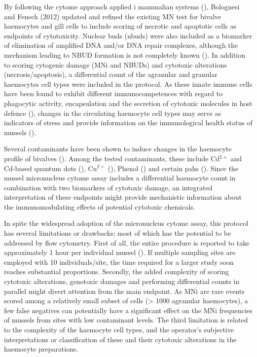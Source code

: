 By following the cytome approach applied i mammalian systems (\cite{Fenech2007}), Bolognesi and Fenech (2012) updated and refined the existing MN test for bivalve haemocytes and gill cells to include scoring of necrotic and apoptotic cells as endpoints of cytotoxicity. Nuclear buds (\acrshort{nbuds}) were also included as a biomarker of elimination of amplified DNA and/or DNA repair complexes, although the mechanism leading to NBUD formation is not completely known (\cite{Bolognesi2012}). In addition to scoring cytogenic damage (MNi and NBUDs) and cytotoxic alterations (necrosis/apoptosis), a differential count of the agranular and granular haemocytes cell types were included in the protocol. As these innate immune cells have been found to exhibit different immunocompetences with regard to phagocytic activity, encapsulation and the secretion of cytotoxic molecules in host defence (\cite{delaBallina2022}), changes in the circulating haemocyte cell types may serve as indicators of stress and provide information on the immunological health status of mussels (\cite{Couch1993}).

Several contaminants have been shown to induce changes in the haemocyte profile of bivalves (\cite{Couch1993}). Among the tested contaminants, these include Cd$^{2+}$ and Cd-based quantum dots (\cite{Rocha2014, Auffret1994}), Cu$^{2+}$ (\cite{Pipe1995, Pipe1999}), Phenol (\cite{Fries1980}) and certain \acrshort{pahs} (\cite{Dyrynda1998, Dyrynda2000}). Since the mussel micronucleus cytome assay includes a differential haemocyte count in combination with two biomarkers of cytotoxic damage, an integrated interpretation of these endpoints might provide mechanistic information about the immunomodulating effects of potential cytotoxic chemicals. 

In spite the widespread adoption of the micronucleus cytome assay, this protocol has several limitations or drawbacks; most of which has the potential to be addressed by flow cytometry. First of all, the entire procedure is reported to take approximately 1 hour per individual mussel (\cite{Bolognesi2012}). If multiple sampling sites are employed with 10 individuals/site, the time required for a larger study soon reaches substantial proportions. Secondly, the added complexity of scoring cytotoxic alterations, genotoxic damages and performing differential counts in parallel might divert attention from the main endpoint. As MNi are rare events scored among a relatively small subset of cells (> 1000 agranular haemocytes), a few false negatives can potentially have a significant effect on the MNi frequencies of mussels from sites with low contaminant levels. The third limitation is related to the complexity of the haemocyte cell types, and the operator's subjective interpretations or classification of these and their cytotoxic alterations in the haemocyte preparations. 

